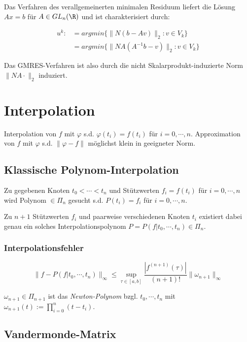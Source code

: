 Das Verfahren des verallgemeinerten minimalen Residuum liefert die Lösung $Ax=b$ für $A \in GL_n(\R)$ und ist charakterisiert durch:

\vspace{-4mm}
\begin{align*}
	u^k :&= argmin\{\|N(b-Av)\|_2 : v \in V_k\} \\
	     &= argmin\{\|NA(A^{-1}b-v)\|_2 : v \in V_k\}
\end{align*}

Das GMRES-Verfahren ist also durch die nicht Skalarprodukt-induzierte  Norm $\|NA\cdot\|_2$ induziert.

\section*{Interpolation}

Interpolation von $f$ mit $\varphi$ s.d. $\varphi(t_i) = f(t_i)$ für $i = 0,\cdots, n$. Approximation von $f$ mit $\varphi$ s.d. $\|\varphi - f\|$ möglichst klein in geeigneter Norm.

\subsection*{Klassische Polynom-Interpolation}

Zu gegebenen Knoten $t_0 < \cdots < t_n$ und Stützwerten $f_i = f(t_i)$ für $i = 0,\cdots,n$ wird Polynom $ \in \Pi_n$ gesucht s.d. $P(t_i)=f_i$ für $i = 0,\cdots,n$.

Zu $n+1$ Stützwerten $f_i$ und paarweise verschiedenen Knoten $t_i$ existiert dabei genau ein solches Interpolationspolynom $P=P(f|t_0,\cdots,t_n) \in \Pi_n$.

\subsubsection*{Interpolationsfehler}

\vspace{-4mm}
$$\|f-P(f|t_0, \cdots, t_n)\|_\infty \leq \sup_{\tau \in [a,b]} \frac{|f^{(n+1)}(\tau)|}{(n+1)!} \|\omega_{n+1}\|_\infty$$

$\omega_{n+1} \in \Pi_{n+1}$ ist das \emph{Newton-Polynom} bzgl. $t_0, \cdots, t_n$ mit $\omega_{n+1}(t) := \prod_{i=0}^n (t-t_i)$.

\subsection*{Vandermonde-Matrix}


